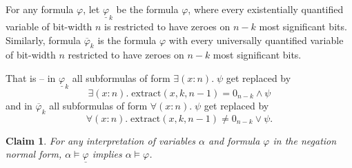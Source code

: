 \documentclass[a4paper]{article}
\newtheorem{claim}{Claim}
\begin{document}
For any formula $\varphi$, let $\underline{\varphi}_k$ be the formula $\varphi$, where every existentially quantified variable of bit-width $n$ is restricted to have zeroes on $n-k$ most significant bits. Similarly, formula $\overline{\varphi}_k$ is the formula $\varphi$ with every universally quantified variable of bit-width $n$ restricted to have zeroes on $n-k$ most significant bits.

That is -- in $\underline{\varphi}_k$ all subformulas of form $\exists (x : n) . \; \psi$ get replaced by 
\[
  \exists (x : n) . \; \mathrm{extract}(x, k, n-1) = 0_{n-k} \wedge \psi
\]
and in $\overline{\varphi}_k$ all subformulas of form $\forall (x : n) . \; \psi$ get replaced by
\[
  \forall (x : n) . \; \mathrm{extract}(x, k, n-1) \not = 0_{n-k} \vee \psi.
\]

\begin{claim}
  For any interpretation of variables $\alpha$ and formula $\varphi$ in the negation normal form, $\alpha \models \underline{\varphi}$ implies $\alpha \models \varphi$.
\end{claim}
\end{document}
